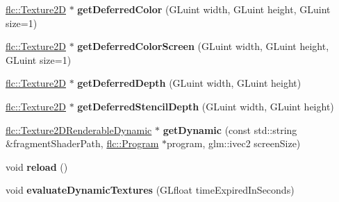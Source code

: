 \begin{DoxyCompactItemize}
\item 
\hyperlink{classflw_1_1flc_1_1Texture2D}{flc\+::\+Texture2D} $\ast$ {\bfseries get\+Deferred\+Color} (G\+Luint width, G\+Luint height, G\+Luint size=1)\hypertarget{classflw_1_1flf_1_1TextureSystem_a36bc7a5329d3fefbde138edf7f7f755e}{}\label{classflw_1_1flf_1_1TextureSystem_a36bc7a5329d3fefbde138edf7f7f755e}

\item 
\hyperlink{classflw_1_1flc_1_1Texture2D}{flc\+::\+Texture2D} $\ast$ {\bfseries get\+Deferred\+Color\+Screen} (G\+Luint width, G\+Luint height, G\+Luint size=1)\hypertarget{classflw_1_1flf_1_1TextureSystem_ab9410893146bdceeffa40920854d0a80}{}\label{classflw_1_1flf_1_1TextureSystem_ab9410893146bdceeffa40920854d0a80}

\item 
\hyperlink{classflw_1_1flc_1_1Texture2D}{flc\+::\+Texture2D} $\ast$ {\bfseries get\+Deferred\+Depth} (G\+Luint width, G\+Luint height)\hypertarget{classflw_1_1flf_1_1TextureSystem_a16d7fa82194030e053f4b6e31b16a6ea}{}\label{classflw_1_1flf_1_1TextureSystem_a16d7fa82194030e053f4b6e31b16a6ea}

\item 
\hyperlink{classflw_1_1flc_1_1Texture2D}{flc\+::\+Texture2D} $\ast$ {\bfseries get\+Deferred\+Stencil\+Depth} (G\+Luint width, G\+Luint height)\hypertarget{classflw_1_1flf_1_1TextureSystem_adc4389c36ca208aac2fb7169811dd1d9}{}\label{classflw_1_1flf_1_1TextureSystem_adc4389c36ca208aac2fb7169811dd1d9}

\item 
\hyperlink{classflw_1_1flc_1_1Texture2DRenderableDynamic}{flc\+::\+Texture2\+D\+Renderable\+Dynamic} $\ast$ {\bfseries get\+Dynamic} (const std\+::string \&fragment\+Shader\+Path, \hyperlink{classflw_1_1flc_1_1Program}{flc\+::\+Program} $\ast$program, glm\+::ivec2 screen\+Size)\hypertarget{classflw_1_1flf_1_1TextureSystem_a22fc3ecfeb13b08a3e025463b7158afd}{}\label{classflw_1_1flf_1_1TextureSystem_a22fc3ecfeb13b08a3e025463b7158afd}

\item 
void {\bfseries reload} ()\hypertarget{classflw_1_1flf_1_1TextureSystem_a91cc19d1dcd33ef3ad9bb9f7f6594d38}{}\label{classflw_1_1flf_1_1TextureSystem_a91cc19d1dcd33ef3ad9bb9f7f6594d38}

\item 
void {\bfseries evaluate\+Dynamic\+Textures} (G\+Lfloat time\+Expired\+In\+Seconds)\hypertarget{classflw_1_1flf_1_1TextureSystem_a40a4c044212ad771e4e832970d1e50b7}{}\label{classflw_1_1flf_1_1TextureSystem_a40a4c044212ad771e4e832970d1e50b7}


\end{DoxyCompactItemize}
